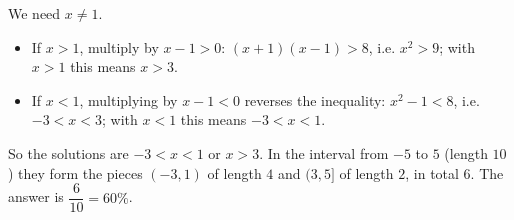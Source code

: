 We need $x\ne1$.
\begin{itemize}
\item If $x>1$, multiply by $x-1>0$: $(x+1)(x-1)>8$, i.e. $x^2>9$; with $x>1$ this means $x>3$.
\item If $x<1$, multiplying by $x-1<0$ reverses the inequality: $x^2-1<8$, i.e. $-3<x<3$; with $x<1$ this means $-3<x<1$.
\end{itemize}
So the solutions are $-3<x<1$ or $x>3$. In the interval from $-5$ to $5$ (length $10$) they form the pieces $(-3,1)$ of length $4$ and $(3,5]$ of length $2$, in total $6$. The answer is $\dfrac{6}{10}=\boxed{60\%}$.
